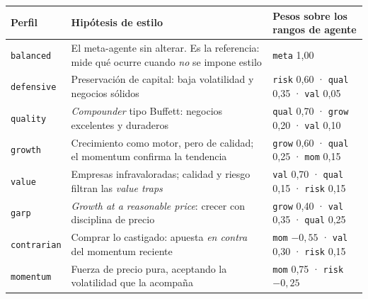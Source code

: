 \begin{tabularx}{\textwidth}{lXl}
\toprule
Perfil & Hipótesis de estilo & Pesos sobre los rangos de agente \\
\midrule
\texttt{balanced} &
El meta-agente sin alterar. Es la referencia: mide qué ocurre cuando \emph{no} se impone estilo &
\texttt{meta} 1,00 \\
\addlinespace
\texttt{defensive} &
Preservación de capital: baja volatilidad y negocios sólidos &
\texttt{risk} 0,60 · \texttt{qual} 0,35 · \texttt{val} 0,05 \\
\addlinespace
\texttt{quality} &
\textit{Compounder} tipo Buffett: negocios excelentes y duraderos &
\texttt{qual} 0,70 · \texttt{grow} 0,20 · \texttt{val} 0,10 \\
\addlinespace
\texttt{growth} &
Crecimiento como motor, pero de calidad; el momentum confirma la tendencia &
\texttt{grow} 0,60 · \texttt{qual} 0,25 · \texttt{mom} 0,15 \\
\addlinespace
\texttt{value} &
Empresas infravaloradas; calidad y riesgo filtran las \textit{value traps} &
\texttt{val} 0,70 · \texttt{qual} 0,15 · \texttt{risk} 0,15 \\
\addlinespace
\texttt{garp} &
\textit{Growth at a reasonable price}: crecer con disciplina de precio &
\texttt{grow} 0,40 · \texttt{val} 0,35 · \texttt{qual} 0,25 \\
\addlinespace
\texttt{contrarian} &
Comprar lo castigado: apuesta \emph{en contra} del momentum reciente &
\texttt{mom} $-0{,}55$ · \texttt{val} 0,30 · \texttt{risk} 0,15 \\
\addlinespace
\texttt{momentum} &
Fuerza de precio pura, aceptando la volatilidad que la acompaña &
\texttt{mom} 0,75 · \texttt{risk} $-0{,}25$ \\
\bottomrule
\end{tabularx}
